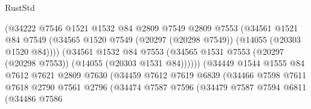 \begin{lexlean}{RustStd}
\begin{coremodule}
                                    (@34222
                                      @7546
                                      @1521
                                      @1532
                                      @84
                                      @2809
                                      @7549
                                      @2809
                                      @7553
                                      (@34561
                                        @1521
                                        @84
                                        @7549
                                        (@34565
                                          @1520
                                          @7549
                                          (@20297 (@20298 @7549))
                                          (@14055 (@20303 @1520 @84))))
                                      (@34561
                                        @1532
                                        @84
                                        @7553
                                        (@34565
                                          @1531
                                          @7553
                                          (@20297 (@20298 @7553))
                                          (@14055 (@20303 @1531 @84))))))
                                  (@34449
                                    @1544
                                    @1555
                                    @84
                                    @7612
                                    @7621
                                    @2809
                                    @7630
                                    (@34459
                                      @7612
                                      @7619
                                      @6839
                                      (@34466
                                        @7598
                                        @7611
                                        @7618
                                        @2790
                                        @7561
                                        @2796
                                        (@34474
                                          @7587
                                          @7596
                                          (@34479
                                            @7587
                                            @7594
                                            @6811
                                            (@34486
                                              @7586

\end{coremodule}
\end{lexlean}
